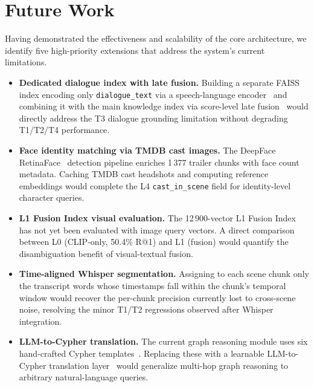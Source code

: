 \documentclass[11pt]{article}
\begin{document}
\section{Future Work}
\label{sec:future}

Having demonstrated the effectiveness and scalability of the core architecture,
we identify five high-priority extensions that address the system's current
limitations.

\begin{itemize}[leftmargin=1.4em]
  \item \textbf{Dedicated dialogue index with late fusion.}  Building a
        separate FAISS index encoding only \texttt{dialogue\_text} via a
        speech-language encoder~\cite{sbert} and combining it with the main
        knowledge index via score-level late fusion~\cite{colbert,dpr} would
        directly address the T3 dialogue grounding limitation without degrading
        T1/T2/T4 performance.

  \item \textbf{Face identity matching via TMDB cast images.}  The DeepFace
        RetinaFace~\cite{retinaface} detection pipeline enriches 1\,377 trailer
        chunks with face count metadata.  Caching TMDB cast headshots and
        computing reference embeddings would complete the L4
        \texttt{cast\_in\_scene} field for identity-level character queries.

  \item \textbf{L1 Fusion Index visual evaluation.}  The 12\,900-vector L1
        Fusion Index has not yet been evaluated with image query vectors.  A
        direct comparison between L0 (CLIP-only, 50.4\% R@1) and L1 (fusion)
        would quantify the disambiguation benefit of visual-textual fusion.

  \item \textbf{Time-aligned Whisper segmentation.}  Assigning to each scene
        chunk only the transcript words whose timestamps fall within the
        chunk's temporal window would recover the per-chunk precision currently
        lost to cross-scene noise, resolving the minor T1/T2 regressions
        observed after Whisper integration.

  \item \textbf{LLM-to-Cypher translation.}  The current graph reasoning
        module uses six hand-crafted Cypher templates~\cite{neo4j}.
        Replacing these with a learnable LLM-to-Cypher translation
        layer~\cite{react,toolformer} would generalize multi-hop graph
        reasoning to arbitrary natural-language queries.
\end{itemize}
\end{document}
